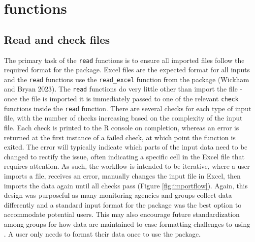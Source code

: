 \hypertarget{functions}{%
\section{\texorpdfstring{ functions}{ functions}}\label{functions}}

\hypertarget{read-and-check-files}{%
\subsection{Read and check files}\label{read-and-check-files}}

The primary task of the \texttt{read} functions is to ensure all imported files follow the required format for the package. Excel files are the expected format for all inputs and the \texttt{read} functions use the \texttt{read\_excel} function from the  package (Wickham and Bryan 2023). The \texttt{read} functions do very little other than import the file - once the file is imported it is immediately passed to one of the relevant \texttt{check} functions inside the \texttt{read} function. There are several checks for each type of input file, with the number of checks increasing based on the complexity of the input file. Each check is printed to the R console on completion, whereas an error is returned at the first instance of a failed check, at which point the function is exited. The error will typically indicate which parts of the input data need to be changed to rectify the issue, often indicating a specific cell in the Excel file that requires attention. As such, the workflow is intended to be iterative, where a user imports a file, receives an error, manually changes the input file in Excel, then imports the data again until all checks pass (Figure \ref{fig:importflow}). Again, this design was purposeful as many monitoring agencies and groups collect data differently and a standard input format for the package was the best option to accommodate potential users. This may also encourage future standardization among groups for how data are maintained to ease formatting challenges to using . A user only needs to format their data once to use the package.

